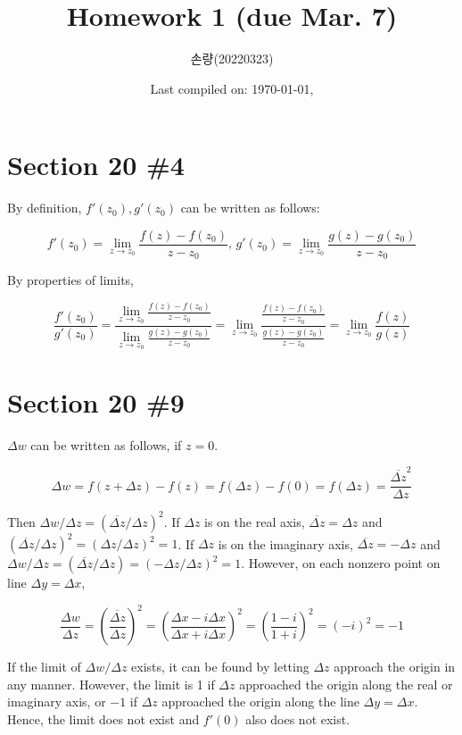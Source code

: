 \documentclass{scrartcl}
\title{Homework 1 (due Mar. 7)}
\author{손량(20220323)}
\date{Last compiled on: \today, \currenttime}
\begin{document}
\maketitle

\section{Section 20 \#4}
By definition, \(f'(z_0), g'(z_0)\) can be written as follows:

\[
  f'(z_0) = \lim_{z \to z_0} \frac{f(z) - f(z_0)}{z - z_0},\, g'(z_0) = \lim_{z \to z_0} \frac{g(z) - g(z_0)}{z - z_0}
\]

By properties of limits,

\[
  \frac{f'(z_0)}{g'(z_0)} = \frac{\lim_{z \to z_0} \frac{f(z) - f(z_0)}{z - z_0}}{\lim_{z \to z_0} \frac{g(z) - g(z_0)}{z - z_0}} = \lim_{z \to z_0} \frac{\frac{f(z) - f(z_0)}{z - z_0}}{\frac{g(z) - g(z_0)}{z - z_0}} = \lim_{z \to z_0} \frac{f(z)}{g(z)}
\]

\section{Section 20 \#9}
\(\Delta w\) can be written as follows, if \(z = 0\).

\[
  \Delta w = f(z + \Delta z) - f(z) = f(\Delta z) - f(0) = f(\Delta z) = \frac{\overline{\Delta z}^2}{\Delta z}
\]

Then \(\Delta w/\Delta z = \left(\overline{\Delta z} / \Delta z\right)^2\).
If \(\Delta z\) is on the real axis, \(\overline{\Delta z} = \Delta z\) and \(\left(\overline{\Delta z} / \Delta z\right)^2 = \left( \Delta z / \Delta z \right)^2 = 1\).
If \(\Delta z\) is on the imaginary axis, \(\overline{\Delta z} = -\Delta z\) and \(\Delta w / \Delta z = \left( \overline{\Delta z} / \Delta z \right) = \left( -\Delta z / \Delta z \right)^2 = 1\).
However, on each nonzero point on line \(\Delta y = \Delta x\),

\[
  \frac{\Delta w}{\Delta z} = \left( \frac{\overline{\Delta z}}{\Delta z} \right)^2 = \left( \frac{\Delta x - i\Delta x}{\Delta x + i\Delta x} \right)^2 = \left( \frac{1 - i}{1 + i} \right)^2 = (-i)^2 = -1
\]

If the limit of \(\Delta w / \Delta z\) exists, it can be found by letting \(\Delta z\) approach the origin in any manner.
However, the limit is 1 if \(\Delta z\) approached the origin along the real or imaginary axis, or \(-1\) if \(\Delta z\) approached the origin along the line \(\Delta y = \Delta x\).
Hence, the limit does not exist and \(f'(0)\) also does not exist.
\end{document}
